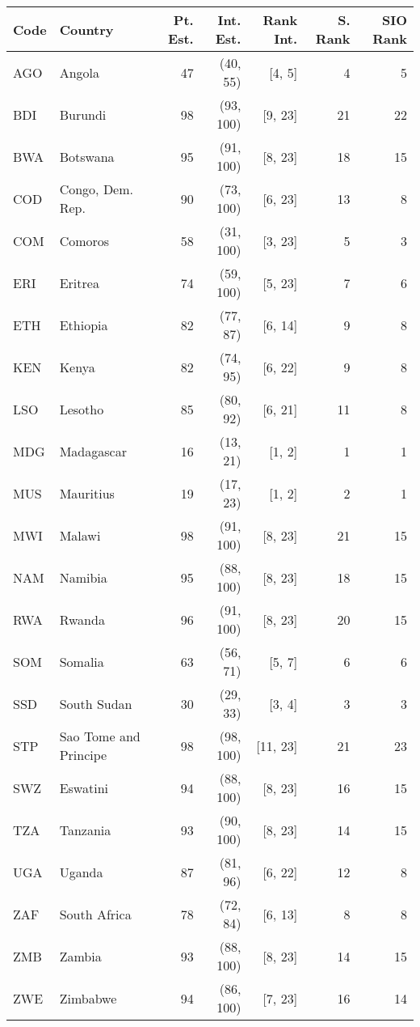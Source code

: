 \begin{tabular}{|ll|rrrrr|}
  \hline
Code & Country & Pt. Est. & Int. Est. & Rank Int. & S. Rank & SIO Rank \\ 
  \hline
AGO & Angola &  47 & (40, 55) & [4, 5] &   4 &   5 \\ 
  BDI & Burundi &  98 & (93, 100) & [9, 23] &  21 &  22 \\ 
  BWA & Botswana &  95 & (91, 100) & [8, 23] &  18 &  15 \\ 
  COD & Congo, Dem. Rep. &  90 & (73, 100) & [6, 23] &  13 &   8 \\ 
  COM & Comoros &  58 & (31, 100) & [3, 23] &   5 &   3 \\ 
  ERI & Eritrea &  74 & (59, 100) & [5, 23] &   7 &   6 \\ 
  ETH & Ethiopia &  82 & (77, 87) & [6, 14] &   9 &   8 \\ 
  KEN & Kenya &  82 & (74, 95) & [6, 22] &   9 &   8 \\ 
  LSO & Lesotho &  85 & (80, 92) & [6, 21] &  11 &   8 \\ 
  MDG & Madagascar &  16 & (13, 21) & [1, 2] &   1 &   1 \\ 
  MUS & Mauritius &  19 & (17, 23) & [1, 2] &   2 &   1 \\ 
  MWI & Malawi &  98 & (91, 100) & [8, 23] &  21 &  15 \\ 
  NAM & Namibia &  95 & (88, 100) & [8, 23] &  18 &  15 \\ 
  RWA & Rwanda &  96 & (91, 100) & [8, 23] &  20 &  15 \\ 
  SOM & Somalia &  63 & (56, 71) & [5, 7] &   6 &   6 \\ 
  SSD & South Sudan &  30 & (29, 33) & [3, 4] &   3 &   3 \\ 
  STP & Sao Tome and Principe &  98 & (98, 100) & [11, 23] &  21 &  23 \\ 
  SWZ & Eswatini &  94 & (88, 100) & [8, 23] &  16 &  15 \\ 
  TZA & Tanzania &  93 & (90, 100) & [8, 23] &  14 &  15 \\ 
  UGA & Uganda &  87 & (81, 96) & [6, 22] &  12 &   8 \\ 
  ZAF & South Africa &  78 & (72, 84) & [6, 13] &   8 &   8 \\ 
  ZMB & Zambia &  93 & (88, 100) & [8, 23] &  14 &  15 \\ 
  ZWE & Zimbabwe &  94 & (86, 100) & [7, 23] &  16 &  14 \\ 
   \hline
\end{tabular}
